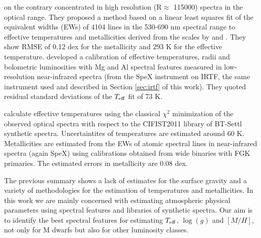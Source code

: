 \cite{2014A&A...568A.121N} on the contrary concentrated in
high resolution (R$\approx$ 115000) spectra in the optical range.
They proposed a method based on a linear least squares fit of the
equivalent widths (EWs) of 4104 lines in the 530-690 nm spectral range
to effective temperatures and metallicities derived from the scales
by \cite{2012A&A...538A..25N} and \cite{2008MNRAS.389..585C}.  They
show RMSE of 0.12 dex for the metallicity and 293 K for the effective
temperature. \cite{2015ApJ...800...85N} developed a calibration of
effective temperatures, radii and bolometric luminosities with Mg and
Al spectral features measured in low-resolution near-infrared spectra
(from the SpeX instrument on IRTF, the same instrument used and
described in Section \ref{sec:irtf} of this work).  They quoted 
residual standard deviations of the $T_{\rm eff}$ fit of 73
K.

\cite{Mann2015} calculate effective temperatures using the
classical $\chi^2$ minimization of the observed optical spectra with
respect to the CIFIST2011 library of BT-Settl synthetic spectra.
Uncertaintites of temperatures are estimated around 60 K.
Metallicities are estimated from the EWs of atomic spectral lines in
near-infrared spectra (again SpeX) using calibrations obtained from
wide binaries with FGK primaries. The estimated errors in metallicity
are 0.08 dex.

The previous summary shows a lack of estimates for the surface gravity
and a variety of methodologies for the estimation of temperatures and
metallicities. In this work we are mainly concerned with estimating
atmospheric physical parameters using spectral features and libraries
of synthetic spectra. Our aim is to identify the best spectral
features for estimating $T_{\rm eff}$, $\log(g)$ and $[M/H]$, not only
for M dwarfs but also for other luminosity classes.

